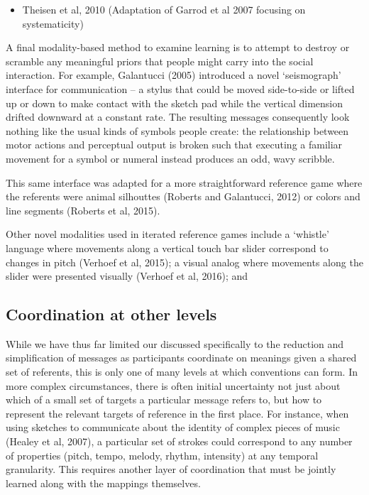 \documentclass[11pt, floatsintext, jou]{apa6}
\begin{document}
\begin{itemize}
\item Theisen et al, 2010 (Adaptation of Garrod et al 2007 focusing on systematicity)
\end{itemize}

A final modality-based method to examine learning is to attempt to destroy or scramble any meaningful priors that people might carry into the social interaction. For example, Galantucci (2005) introduced a novel `seismograph' interface for communication -- a stylus that could be moved side-to-side or lifted up or down to make contact with the sketch pad while the vertical dimension drifted downward at a constant rate. The resulting messages consequently look nothing like the usual kinds of symbols people create: the relationship between motor actions and perceptual output is broken such that executing a familiar movement for a symbol or numeral instead produces an odd, wavy scribble. 

This same interface was adapted for a more straightforward reference game where the referents were animal silhouttes (Roberts and Galantucci, 2012) or colors and line segments (Roberts et al, 2015). 

Other novel modalities used in iterated reference games include a `whistle' language where movements along a vertical touch bar slider correspond to changes in pitch (Verhoef et al, 2015); a visual analog where movements along the slider were presented visually (Verhoef et al, 2016); and 

\subsection{Coordination at other levels}

While we have thus far limited our discussed specifically to the reduction and simplification of messages as participants coordinate on meanings given a shared set of referents, this is only one of many levels at which conventions can form. In more complex circumstances, there is often initial uncertainty not just about which of a small set of targets a particular message refers to, but how to represent the relevant targets of reference in the first place. For instance, when using sketches to communicate about the identity of complex pieces of music (Healey et al, 2007), a particular set of strokes could correspond to any number of properties (pitch, tempo, melody, rhythm, intensity) at any temporal granularity. This requires another layer of coordination that must be jointly learned along with the mappings themselves. 
\end{document}
